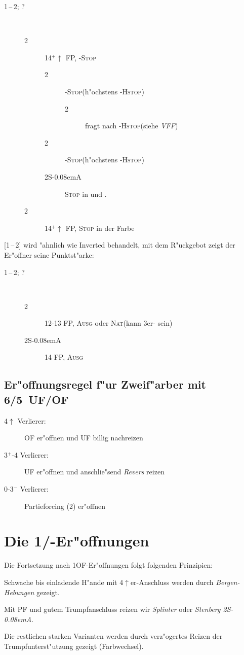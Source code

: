 \documentclass[11pt,german,twocolumn,twoside]{scrartcl}
\def\pi{\Sp\xspace}
\def\co{\He\xspace}
\def\ka{\Di\xspace}
\def\sa{\nobreak\textsf{S\kern-0.08emA}\xspace}
\def\pik{\nobreak\hspace{\cardskip}\Sp\xspace}
\def\coe{\nobreak\hspace{\cardskip}\He\xspace}
\def\kar{\nobreak\hspace{\cardskip}\Di\xspace}
\def\tre{\nobreak\hspace{\cardskip}\Cl\xspace}
\def\SA{\nobreak\hspace{\cardskip}\sa}
\def\of{\nobreak\hspace{\cardskip}\textsf{OF}\xspace}
\def\uf{\nobreak\hspace{\cardskip}\textsf{UF}\xspace}
\def\good{$^+$\xspace}
\def\bad{$^-$\xspace}
\def\pl{$\uparrow$\xspace}
\def\sep{\,--\,}
\newcommand{\conv}[1]{\emph{#1}}
\def\bal{\textsc{Ausg}\xspace}
\def\nat{\textsc{Nat}\xspace}
\def\pf{\textsc{PF}\xspace}
\def\stp{\textsc{Stop}\xspace}
\def\hstp{\textsc{Hstop}\xspace}
\def\cstop{\co-\stp}
\def\pstop{\pi-\stp}
\def\kstop{\ka-\stp}
\def\chstop{\co-\hstp}
\def\phstop{\pi-\hstp}
\def\bdsc{\begin{description}}
\def\edsc{\end{description}}
\newcommand{\Index}[1]{#1\index{#1}}
\begin{document}
\bdsc
  \item[1\tre{}\sep2\tre; ?]~
    \bdsc
      \item[2\kar] 14\good{}\pl FP, \kstop
        \bdsc
        \item[2\coe] \cstop (h"ochstens \phstop)
          \bdsc
          \item[2\pik] fragt nach \phstop (siehe \conv{VFF})
          \edsc
        \item[2\pik] \pstop (h"ochstens \chstop)
        \item[2\SA] \stp in \co und \pi.
        \edsc
      \item[2\coe-2\pik] 14\good{}\pl FP, \stp in der Farbe
    \edsc
\edsc

[1\kar{}\sep2\tre] wird "ahnlich wie Inverted behandelt, mit dem R"uckgebot
zeigt der Er"offner seine Punktst"arke:

\bdsc
  \item[1\kar{}\sep2\tre; ?]~
    \bdsc
    \item[2\kar] 12-13 FP, \bal oder \nat (kann 3er-\ka sein)
    \item[2\SA] 14 FP, \bal
    \edsc
\edsc


\subsection{\label{zfregel}Er"offnungsregel f"ur Zweif"arber mit 6/5~\uf/\of}

\bdsc
\item[4\pl{} Verlierer:] \of er"offnen und \uf billig nachreizen
\item[3\good-4 Verlierer:] \uf er"offnen und anschlie"send \conv{Revers}
  reizen
\item[0-3\bad Verlierer:] Partieforcing (2\kar) er"offnen
\edsc

\newpage
\section{Die 1\coe/\pi-Er"offnungen}

Die Fortsetzung nach 1\of-Er"offnungen folgt folgenden Prinzipien:
\begin{compactitem}
\item Schwache bis einladende H"ande mit 4\pl{}er-Anschluss werden durch
  \conv{Bergen-Hebungen} gezeigt.
\item Mit \pf und gutem Trumpfanschluss reizen wir
  \conv{\Index{Splinter}} oder \conv{Stenberg 2\SA}.
\item Die restlichen starken Varianten werden durch verz"ogertes
  Reizen der Trumpfunterst"utzung gezeigt (Farbwechsel).
\end{compactitem}
\end{document}
